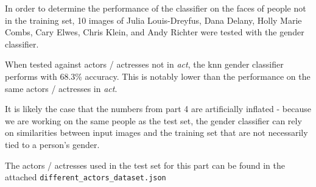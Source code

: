 \documentclass[]{article}
\begin{document}
In order to determine the performance of the classifier on the faces of
people not in the training set, 10 images of Julia Louis-Dreyfus, Dana
Delany, Holly Marie Combs, Cary Elwes, Chris Klein, and Andy Richter
were tested with the gender classifier.

When tested against actors / actresses not in \emph{act}, the knn gender
classifier performs with \(68.3\)\% accuracy. This is notably lower than
the performance on the same actors / actresses in \emph{act}.

It is likely the case that the numbers from part 4 are artificially
inflated - because we are working on the same people as the test set,
the gender classifier can rely on similarities between input images and
the training set that are not necessarily tied to a person's gender.

The actors / actresses used in the test set for this part can be found
in the attached \texttt{different\_actors\_dataset.json}
\end{document}
